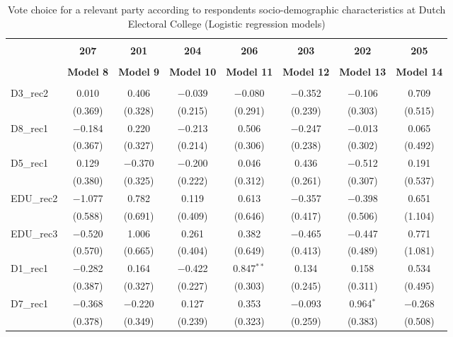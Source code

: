 \documentclass[
]{article}
\begin{document}
\begin{table}[!htbp] \centering 
  \caption{Vote choice for a relevant party according to respondents 
                       socio-demographic characteristics at Dutch Electoral College (Logistic regression models)} 
  \label{table:full_logit_be_du} 
\begin{tabular}{@{\extracolsep{5pt}}lccccccc} 
\\[-1.8ex]\hline \\[-1.8ex] 
 & \textbf{207} & \textbf{201} & \textbf{204} & \textbf{206} & \textbf{203} & \textbf{202} & \textbf{205} \\ 
\\[-1.8ex] & \textbf{Model 8} & \textbf{Model 9} & \textbf{Model 10} & \textbf{Model 11} & \textbf{Model 12} & \textbf{Model 13} & \textbf{Model 14}\\ 
\hline \\[-1.8ex] 
 D3\_rec2 & 0.010 & 0.406 & $-$0.039 & $-$0.080 & $-$0.352 & $-$0.106 & 0.709 \\ 
  & (0.369) & (0.328) & (0.215) & (0.291) & (0.239) & (0.303) & (0.515) \\ 
  D8\_rec1 & $-$0.184 & 0.220 & $-$0.213 & 0.506 & $-$0.247 & $-$0.013 & 0.065 \\ 
  & (0.367) & (0.327) & (0.214) & (0.306) & (0.238) & (0.302) & (0.492) \\ 
  D5\_rec1 & 0.129 & $-$0.370 & $-$0.200 & 0.046 & 0.436 & $-$0.512 & 0.191 \\ 
  & (0.380) & (0.325) & (0.222) & (0.312) & (0.261) & (0.307) & (0.537) \\ 
  EDU\_rec2 & $-$1.077 & 0.782 & 0.119 & 0.613 & $-$0.357 & $-$0.398 & 0.651 \\ 
  & (0.588) & (0.691) & (0.409) & (0.646) & (0.417) & (0.506) & (1.104) \\ 
  EDU\_rec3 & $-$0.520 & 1.006 & 0.261 & 0.382 & $-$0.465 & $-$0.447 & 0.771 \\ 
  & (0.570) & (0.665) & (0.404) & (0.649) & (0.413) & (0.489) & (1.081) \\ 
  D1\_rec1 & $-$0.282 & 0.164 & $-$0.422 & 0.847$^{**}$ & 0.134 & 0.158 & 0.534 \\ 
  & (0.387) & (0.327) & (0.227) & (0.303) & (0.245) & (0.311) & (0.495) \\ 
  D7\_rec1 & $-$0.368 & $-$0.220 & 0.127 & 0.353 & $-$0.093 & 0.964$^{*}$ & $-$0.268 \\ 
  & (0.378) & (0.349) & (0.239) & (0.323) & (0.259) & (0.383) & (0.508) \\ 

\end{tabular}
\end{table}
\end{document}

